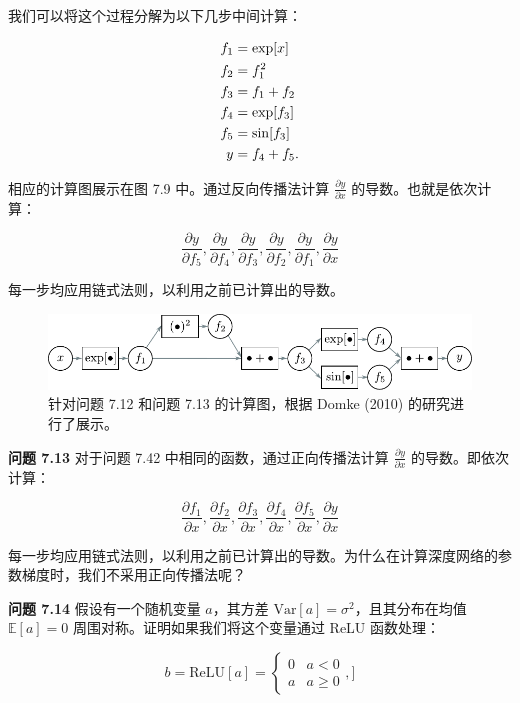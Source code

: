 \documentclass[lang=cn,newtx,10pt,scheme=chinese]{elegantbook}
\begin{document}
我们可以将这个过程分解为以下几步中间计算：

\begin{align}
f_1 &= \exp[x] \notag \\
f_2 &= f_1^2 \notag \\
f_3 &= f_1 + f_2 \notag \\
f_4 &= \exp[f_3] \notag \\
f_5 &= \sin[f_3] \notag \\
y &= f_4 + f_5.
\end{align} 


相应的计算图展示在图 7.9 中。通过反向传播法计算 \(\frac{\partial y}{\partial x}\) 的导数。也就是依次计算：

\begin{equation}
\frac{\partial y}{\partial f_5}, \frac{\partial y}{\partial f_4}, \frac{\partial y}{\partial f_3}, \frac{\partial y}{\partial f_2}, \frac{\partial y}{\partial f_1}, \frac{\partial y}{\partial x} 
\end{equation}

每一步均应用链式法则，以利用之前已计算出的导数。

\begin{figure}[ht!]
\centering
\includegraphics[width=0.7\linewidth]{PDFFigures/UDLChap7PDF/Train2CompGraph.pdf}
\caption{针对问题 7.12 和问题 7.13 的计算图，根据 Domke (2010) 的研究进行了展示。}
\end{figure}

\textbf{问题 7.13} 对于问题 7.42 中相同的函数，通过正向传播法计算 \(\frac{\partial y}{\partial x}\) 的导数。即依次计算：

\begin{equation}
\frac{\partial f_1}{\partial x}, \frac{\partial f_2}{\partial x}, \frac{\partial f_3}{\partial x}, \frac{\partial f_4}{\partial x}, \frac{\partial f_5}{\partial x}, \frac{\partial y}{\partial x} 
\end{equation}

每一步均应用链式法则，以利用之前已计算出的导数。为什么在计算深度网络的参数梯度时，我们不采用正向传播法呢？

\textbf{问题 7.14} 假设有一个随机变量 \(a\)，其方差 \(\text{Var}[a] = \sigma^2\)，且其分布在均值 \(\mathbb{E}[a] = 0\) 周围对称。证明如果我们将这个变量通过 ReLU 函数处理：

\begin{equation}
b = \text{ReLU}[a] = \begin{cases}
0 & a < 0 \\
a & a \geq 0
\end{cases}, ]
\end{equation}
\end{document}
